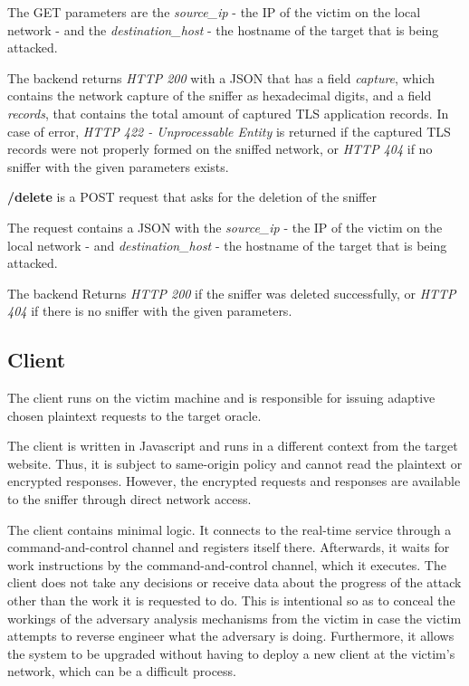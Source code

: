 The GET parameters are the \textit{source\_ip}  - the IP of the victim on the local network -
and the \textit{destination\_host} - the hostname of the target that is being attacked.

The backend returns \textit{HTTP 200} with a JSON that has a field \textit{capture}, which contains the
network capture of the sniffer as hexadecimal digits, and a field \textit{records},
that contains the total amount of captured TLS application records. In case of
error, \textit{HTTP 422 - Unprocessable Entity} is returned if the captured TLS
records were not properly formed on the sniffed network, or \textit{HTTP 404} if no
sniffer with the given parameters exists.

\textbf{/delete} is a POST request that asks for the deletion of the sniffer

The request contains a JSON with the \textit{source\_ip} - the IP of the victim on the local network - 
and \textit{destination\_host} - the hostname of the target that is being attacked.

The backend Returns \textit{HTTP 200} if the sniffer was deleted successfully, or \textit{HTTP 404} if 
there is no sniffer with the given parameters.

\subsection{Client}

The client runs on the victim machine and is responsible for issuing adaptive
chosen plaintext requests to the target oracle.

The client is written in Javascript and runs in a different context from the
target website. Thus, it is subject to same-origin policy and cannot read the
plaintext or encrypted responses. However, the encrypted requests and responses
are available to the sniffer through direct network access.

The client contains minimal logic. It connects to the real-time service through
a command-and-control channel and registers itself there. Afterwards, it waits
for work instructions by the command-and-control channel, which it executes.
The client does not take any decisions or receive data about the progress of
the attack other than the work it is requested to do. This is intentional so as
to conceal the workings of the adversary analysis mechanisms from the victim in
case the victim attempts to reverse engineer what the adversary is doing.
Furthermore, it allows the system to be upgraded without having to deploy a new
client at the victim's network, which can be a difficult process.

